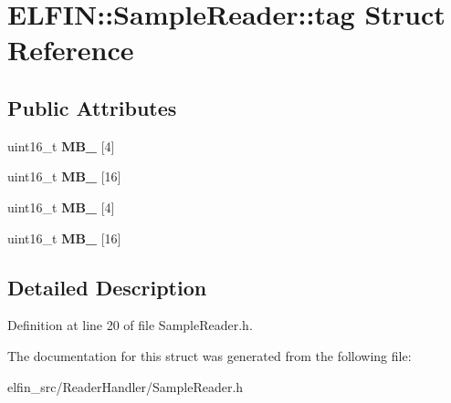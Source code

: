\hypertarget{struct_e_l_f_i_n_1_1_sample_reader_1_1tag}{\section{E\-L\-F\-I\-N\-:\-:Sample\-Reader\-:\-:tag Struct Reference}
\label{struct_e_l_f_i_n_1_1_sample_reader_1_1tag}
}
\subsection*{Public Attributes}
\begin{DoxyCompactItemize}
\item 
\hypertarget{struct_e_l_f_i_n_1_1_sample_reader_1_1tag_a2f21a76628f3d12ef9a08cb8a0c67401}{uint16\-\_\-t {\bfseries M\-B\-\_} \mbox{[}4\mbox{]}}\label{struct_e_l_f_i_n_1_1_sample_reader_1_1tag_a2f21a76628f3d12ef9a08cb8a0c67401}

\item 
\hypertarget{struct_e_l_f_i_n_1_1_sample_reader_1_1tag_af406808115bd35d1c52c676404678469}{uint16\-\_\-t {\bfseries M\-B\-\_} \mbox{[}16\mbox{]}}\label{struct_e_l_f_i_n_1_1_sample_reader_1_1tag_af406808115bd35d1c52c676404678469}

\item 
\hypertarget{struct_e_l_f_i_n_1_1_sample_reader_1_1tag_a3471f88861a38c0080debe2e46a11cd3}{uint16\-\_\-t {\bfseries M\-B\-\_} \mbox{[}4\mbox{]}}\label{struct_e_l_f_i_n_1_1_sample_reader_1_1tag_a3471f88861a38c0080debe2e46a11cd3}

\item 
\hypertarget{struct_e_l_f_i_n_1_1_sample_reader_1_1tag_a1ee516acbb76d0727fea9f1d24c2df03}{uint16\-\_\-t {\bfseries M\-B\-\_} \mbox{[}16\mbox{]}}\label{struct_e_l_f_i_n_1_1_sample_reader_1_1tag_a1ee516acbb76d0727fea9f1d24c2df03}

\end{DoxyCompactItemize}


\subsection{Detailed Description}


Definition at line 20 of file Sample\-Reader.\-h.



The documentation for this struct was generated from the following file\-:\begin{DoxyCompactItemize}
\item 
elfin\-\_\-src/\-Reader\-Handler/Sample\-Reader.\-h\end{DoxyCompactItemize}
